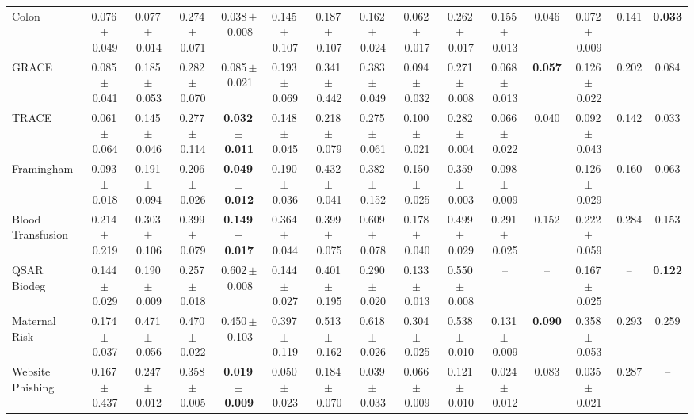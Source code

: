 \documentclass[8pt]{extarticle}
\begin{document}
\begin{longtable}{l*{14}{c}}
Colon & 0.076\,$\pm$\,0.049 & 0.077\,$\pm$\,0.014 & 0.274\,$\pm$\,0.071 & 0.038\,$\pm$\,0.008 & 0.145\,$\pm$\,0.107 & 0.187\,$\pm$\,0.107 & 0.162\,$\pm$\,0.024 & 0.062\,$\pm$\,0.017 & 0.262\,$\pm$\,0.017 & 0.155\,$\pm$\,0.013 & 0.046 & 0.072\,$\pm$\,0.009 & 0.141 & \textbf{0.033} \\
GRACE & 0.085\,$\pm$\,0.041 & 0.185\,$\pm$\,0.053 & 0.282\,$\pm$\,0.070 & 0.085\,$\pm$\,0.021 & 0.193\,$\pm$\,0.069 & 0.341\,$\pm$\,0.442 & 0.383\,$\pm$\,0.049 & 0.094\,$\pm$\,0.032 & 0.271\,$\pm$\,0.008 & 0.068\,$\pm$\,0.013 & \textbf{0.057} & 0.126\,$\pm$\,0.022 & 0.202 & 0.084 \\
TRACE & 0.061\,$\pm$\,0.064 & 0.145\,$\pm$\,0.046 & 0.277\,$\pm$\,0.114 & \textbf{0.032\,$\pm$\,0.011} & 0.148\,$\pm$\,0.045 & 0.218\,$\pm$\,0.079 & 0.275\,$\pm$\,0.061 & 0.100\,$\pm$\,0.021 & 0.282\,$\pm$\,0.004 & 0.066\,$\pm$\,0.022 & 0.040 & 0.092\,$\pm$\,0.043 & 0.142 & 0.033 \\
Framingham & 0.093\,$\pm$\,0.018 & 0.191\,$\pm$\,0.094 & 0.206\,$\pm$\,0.026 & \textbf{0.049\,$\pm$\,0.012} & 0.190\,$\pm$\,0.036 & 0.432\,$\pm$\,0.041 & 0.382\,$\pm$\,0.152 & 0.150\,$\pm$\,0.025 & 0.359\,$\pm$\,0.003 & 0.098\,$\pm$\,0.009 & -- & 0.126\,$\pm$\,0.029 & 0.160 & 0.063 \\
Blood Transfusion & 0.214\,$\pm$\,0.219 & 0.303\,$\pm$\,0.106 & 0.399\,$\pm$\,0.079 & \textbf{0.149\,$\pm$\,0.017} & 0.364\,$\pm$\,0.044 & 0.399\,$\pm$\,0.075 & 0.609\,$\pm$\,0.078 & 0.178\,$\pm$\,0.040 & 0.499\,$\pm$\,0.029 & 0.291\,$\pm$\,0.025 & 0.152 & 0.222\,$\pm$\,0.059 & 0.284 & 0.153 \\
QSAR Biodeg & 0.144\,$\pm$\,0.029 & 0.190\,$\pm$\,0.009 & 0.257\,$\pm$\,0.018 & 0.602\,$\pm$\,0.008 & 0.144\,$\pm$\,0.027 & 0.401\,$\pm$\,0.195 & 0.290\,$\pm$\,0.020 & 0.133\,$\pm$\,0.013 & 0.550\,$\pm$\,0.008 & -- & -- & 0.167\,$\pm$\,0.025 & -- & \textbf{0.122} \\
Maternal Risk & 0.174\,$\pm$\,0.037 & 0.471\,$\pm$\,0.056 & 0.470\,$\pm$\,0.022 & 0.450\,$\pm$\,0.103 & 0.397\,$\pm$\,0.119 & 0.513\,$\pm$\,0.162 & 0.618\,$\pm$\,0.026 & 0.304\,$\pm$\,0.025 & 0.538\,$\pm$\,0.010 & 0.131\,$\pm$\,0.009 & \textbf{0.090} & 0.358\,$\pm$\,0.053 & 0.293 & 0.259 \\
Website Phishing & 0.167\,$\pm$\,0.437 & 0.247\,$\pm$\,0.012 & 0.358\,$\pm$\,0.005 & \textbf{0.019\,$\pm$\,0.009} & 0.050\,$\pm$\,0.023 & 0.184\,$\pm$\,0.070 & 0.039\,$\pm$\,0.033 & 0.066\,$\pm$\,0.009 & 0.121\,$\pm$\,0.010 & 0.024\,$\pm$\,0.012 & 0.083 & 0.035\,$\pm$\,0.021 & 0.287 & -- \\
\end{longtable}
\end{document}
